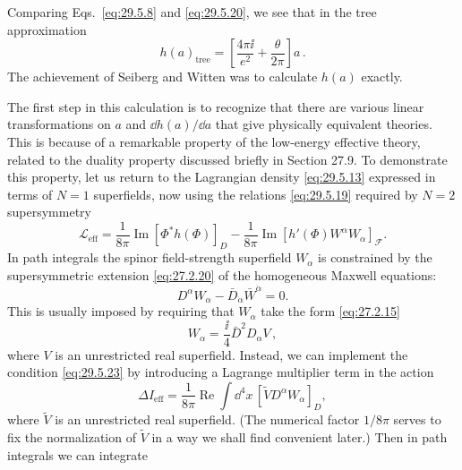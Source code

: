 Comparing Eqs.~\eqref{eq:29.5.8} and \eqref{eq:29.5.20}, we see that in the
tree approximation
\begin{equation}
  h(a)_{\mathrm{tree}}
  =\left[\frac{4\pi \ii}{e^2}+\frac{\theta}{2\pi}\right]a\,.
  \tag{29.5.21}\label{eq:29.5.21}
\end{equation}
The achievement of Seiberg and Witten was to calculate \(h(a)\) exactly.

The first step in this calculation is to recognize that there are various
linear transformations on \(a\) and \(\dd h(a)/\dd a\) that give physically
equivalent theories. This is because of a remarkable property of the
low-energy effective theory, related to the duality property discussed
briefly in Section 27.9. To demonstrate this property, let us return to the
Lagrangian density \eqref{eq:29.5.13} expressed in terms of \(N=1\)
superfields, now using the relations \eqref{eq:29.5.19} required by \(N=2\)
supersymmetry
\begin{equation}
  \mathcal{L}_{\mathrm{eff}}
  =\frac{1}{8\pi}\operatorname{Im}\left[\Phi^*h(\Phi)\right]_D
  -\frac{1}{8\pi}\operatorname{Im}
    \left[h'(\Phi)W^\alpha W_\alpha\right]_{\mathcal F}.
  \tag{29.5.22}\label{eq:29.5.22}
\end{equation}
In path integrals the spinor field-strength superfield \(W_\alpha\) is constrained
by the supersymmetric extension \eqref{eq:27.2.20} of the homogeneous Maxwell
equations:
\begin{equation}
  D^\alpha W_\alpha
  -\bar D_{\dot\alpha}\bar W^{\dot\alpha}=0.
  \tag{29.5.23}\label{eq:29.5.23}
\end{equation}
This is usually imposed by requiring that \(W_\alpha\) take the form
\eqref{eq:27.2.15}
\begin{equation}
  W_\alpha=\frac{\ii}{4}\bar D^2D_\alpha V\,,
  \tag{29.5.24}\label{eq:29.5.24}
\end{equation}
where \(V\) is an unrestricted real superfield. Instead, we can implement
the condition \eqref{eq:29.5.23} by introducing a Lagrange multiplier term
in the action
\begin{equation}
  \Delta I_{\mathrm{eff}}
  =\frac{1}{8\pi}\operatorname{Re}\int \dd^4x\,
    \left[
      \widetilde V
      D^\alpha W_\alpha
    \right]_D,
  \tag{29.5.25}\label{eq:29.5.25}
\end{equation}
where \(\widetilde V\) is an unrestricted real superfield. (The numerical
factor \(1/8\pi\) serves to fix the normalization of \(\widetilde V\) in a
way we shall find convenient later.) Then in path integrals we can integrate
